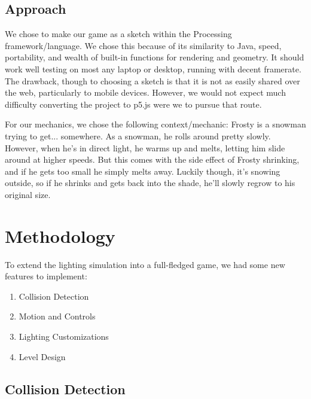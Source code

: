 \documentclass[11pt]{article} %
\begin{document}
\subsection{Approach}

We chose to make our game as a sketch within the Processing framework/language.  We chose this because of its similarity to Java, speed, portability, and wealth of built-in functions for rendering and geometry.  It should work well testing on most any laptop or desktop, running with decent framerate.  The drawback, though to choosing a sketch is that it is not as easily shared over the web, particularly to mobile devices.  However, we would not expect much difficulty converting the project to p5.js were we to pursue that route.\par

For our mechanics, we chose the following context/mechanic: Frosty is a snowman trying to get... somewhere.  As a snowman, he rolls around pretty slowly.  However, when he's in direct light, he warms up and melts, letting him slide around at higher speeds.  But this comes with the side effect of Frosty shrinking, and if he gets too small he simply melts away.  Luckily though, it's snowing outside, so if he shrinks and gets back into the shade, he'll slowly regrow to his original size.

\section{Methodology}

To extend the lighting simulation into a full-fledged game, we had some new features to implement:

\begin{enumerate}
	\item Collision Detection
	\item Motion and Controls
	\item Lighting Customizations
	\item Level Design
\end{enumerate}


\subsection{Collision Detection}
\end{document}
